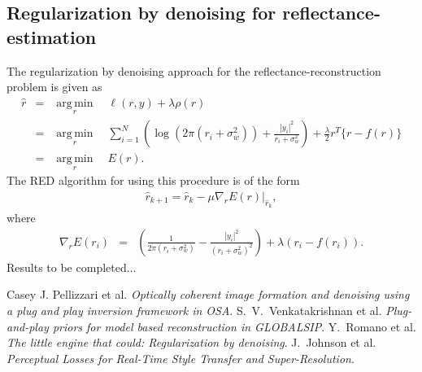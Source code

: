 \documentclass[a4paper, 11pt]{article}
\DeclareMathOperator*{\argmin}{arg\,min}
\begin{document}
\subsection{Regularization by denoising for reflectance-estimation }
The regularization by denoising approach for the reflectance-reconstruction problem is given as 
\begin{eqnarray*}
\hat{r}&=&\underset{r}{\argmin} \quad \ell(r,y)+\lambda \rho(r) \\
&=& \underset{r}{\argmin} \quad \sum_{i=1}^N \left(\log (2\pi (r_i+\sigma_w^2))+\frac{|y_i|^2}{r_i+\sigma_w^2}\right) + \frac{\lambda}{2} r^T\{r-f(r)\} \\
&=&  \underset{r}{\argmin} \quad E(r). 
\end{eqnarray*}
The RED algorithm for using this procedure is of the form 
\begin{eqnarray*}
\hat{r}_{k+1}=\hat{r}_k-\mu \nabla_rE(r)|_{\hat{r}_k}, 
\end{eqnarray*}
where 
\begin{eqnarray*}
\nabla_rE(r_i)&=& \left( \frac{1}{2\pi(r_i+\sigma_w^2)}-\frac{|y_i|^2}{(r_i+\sigma_w^2)^2}\right)+\lambda(r_i-f(r_i)). 
\end{eqnarray*}
Results to be completed...
\begin{thebibliography}{9}
 Casey J. Pellizzari et al. \emph{Optically coherent image formation and denoising using a plug and play inversion framework in OSA}.
 S.~V.~Venkatakrishnan et al. \emph{Plug-and-play priors for model based reconstruction in GLOBALSIP}.
 Y.~Romano et al. \emph{The little engine that could: Regularization by denoising}.
 J.~Johnson et al. \emph{Perceptual Losses for Real-Time Style Transfer and Super-Resolution}.
\end{thebibliography}
\end{document}
